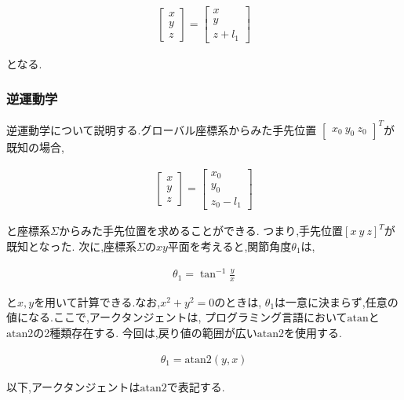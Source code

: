 \begin{align}
  \begin{bmatrix}
    x \\
    y \\
    z
  \end{bmatrix}
  = 
  \begin{bmatrix}
    x \\
    y \\
    z + l_1
  \end{bmatrix} \tag{2.3}
\end{align}

となる.

\subsubsection{逆運動学}
逆運動学について説明する.グローバル座標系からみた手先位置
$\begin{bmatrix} x_0 \ y_0 \ z_0 \end{bmatrix}^T$が既知の場合,

\begin{align}
  \begin{bmatrix} x \\ y \\ z \end{bmatrix} = \begin{bmatrix} x_0 \\ y_0 \\ z_0 - l_1 \end{bmatrix} \tag{2.4}
\end{align}

と座標系$\Sigma$からみた手先位置を求めることができる.
つまり,手先位置$[x \ y \ z]^T$が既知となった.
次に,座標系$\Sigma$の$xy$平面を考えると,関節角度$\theta_1$は,

\begin{align}
  \theta_1 = \tan^{-1} \frac{y}{x} \tag{2.5}
\end{align}

と$x, y$を用いて計算できる.なお,$x^2 + y^2 = 0$のときは,
$\theta_1$は一意に決まらず,任意の値になる.ここで,アークタンジェントは,
プログラミング言語において$\text{atan}$と$\text{atan2}$の2種類存在する.
今回は,戻り値の範囲が広い$\text{atan2}$を使用する.

\begin{align}
  \theta_1 = \text{atan2}(y, x) \tag{2.6}
\end{align}

以下,アークタンジェントは$\text{atan2}$で表記する.

